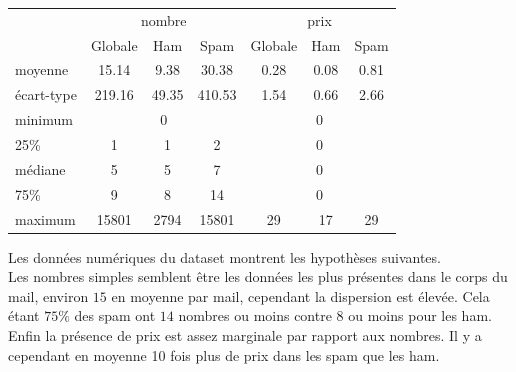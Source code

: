 \documentclass[a4paper,12pt]{article}
\begin{document}
				\begin{table}[H]
					\centering
					 \label{tab:p1nb}
					\begin{tabular}{|l|c|c|c|c|c|c|}
						\hline
						 	& \multicolumn{3}{|c|}{nombre} & \multicolumn{3}{|c|}{prix} \\
						 	& Globale & Ham & Spam & Globale & Ham & Spam \\
						\hline
						moyenne    & 15.14 & 9.38 & 30.38 & 0.28 & 0.08 & 0.81\\
						\hline
						écart-type & 219.16 & 49.35 & 410.53    & 1.54 & 0.66 & 2.66 \\
						\hline
						minimum    & \multicolumn{3}{|c|}{0} & \multicolumn{3}{|c|}{0} \\
						\hline
						25\%       & 1 & 1 & 2      & \multicolumn{3}{|c|}{0} \\
						\hline
						médiane    & 5 & 5 & 7     & \multicolumn{3}{|c|}{0} \\
						\hline
						75\%       & 9 & 8 & 14     & \multicolumn{3}{|c|}{0} \\
						\hline
						maximum    & 15801 & 2794 & 15801  & 29 & 17 & 29 \\
						\hline
					\end{tabular}
				\end{table}
				
				Les données numériques du dataset montrent les hypothèses suivantes.\\
				Les nombres simples semblent être les données les plus présentes dans le corps du mail, environ $15$ en moyenne par mail, cependant la dispersion est élevée. Cela étant $75\%$ des spam ont $14$ nombres ou moins contre $8$ ou moins pour les ham.\\
				Enfin la présence de prix est assez marginale par rapport aux nombres. Il y a cependant en moyenne 10 fois plus de prix dans les spam que les ham.\\
			
\end{document}
